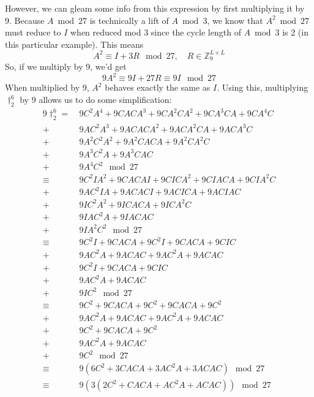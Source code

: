 \documentclass[a4paper, 12pt, reqno]{amsart}
\begin{document}
		However, we can gleam some info from this expression by first multiplying it by 9. Because $A \bmod{27}$ is technically a lift of $A \bmod{3}$, we know that 
		$A^2 \bmod{27}$ must reduce to $I$ when reduced mod 3 since the cycle length of $A \bmod{3}$ is 2 (in this particular example). This means 
		\[
			A^2 \equiv I + 3R \mod{27},\quad R \in \mathds{Z}_9^{L \times L}
		\]
		So, if we multiply by 9, we'd get
		\[
			9A^2 \equiv 9I + 27R \equiv 9I \mod{27}
		\]
		When multiplied by 9, $A^2$ behaves exactly the same as $I$. Using this, multiplying $\dag_2^6$ by 9 allows us to do some simplification:
		\begin{align*}
			9\dag_2^6 =& \ 9C^2A^4    + 9CACA^3  + 9CA^2CA^2 + 9CA^3CA + 9CA^4C \\
			          +& \ 9AC^2A^3   + 9ACACA^2 + 9ACA^2CA  + 9ACA^3C          \\
				      +& \ 9A^2C^2A^2 + 9A^2CACA + 9A^2CA^2C                    \\
				 	  +& \ 9A^3C^2A   + 9A^3CAC                                 \\
					  +& \ 9A^4C^2 \mod{27}                                     \\
			    \equiv & \ 9C^2IA^2 + 9CACAI + 9CICA^2 + 9CIACA + 9CIA^2C \\
				      +& \ 9AC^2IA  + 9ACACI + 9ACICA  + 9ACIAC           \\
					  +& \ 9IC^2A^2 + 9ICACA + 9ICA^2C                    \\
					  +& \ 9IAC^2A  + 9IACAC                              \\
					  +& \ 9IA^2C^2 \mod{27}                              \\
				\equiv & \ 9C^2I  + 9CACA + 9C^2I  + 9CACA + 9CIC \\
				      +& \ 9AC^2A + 9ACAC + 9AC^2A + 9ACAC        \\
					  +& \ 9C^2I  + 9CACA + 9CIC                  \\
					  +& \ 9AC^2A + 9ACAC                         \\
					  +& \ 9IC^2 \mod{27}                         \\
				\equiv & \ 9C^2   + 9CACA + 9C^2   + 9CACA + 9C^2 \\
				      +& \ 9AC^2A + 9ACAC + 9AC^2A + 9ACAC        \\
					  +& \ 9C^2   + 9CACA + 9C^2                  \\
					  +& \ 9AC^2A + 9ACAC                         \\
					  +& \ 9C^2 \mod{27}                          \\
				\equiv & \ 9(6C^2 + 3CACA + 3AC^2A + 3ACAC) \mod{27} \\
				\equiv & \ 9(3(2C^2 + CACA + AC^2A + ACAC)) \mod{27}
		\end{align*}
\end{document}
